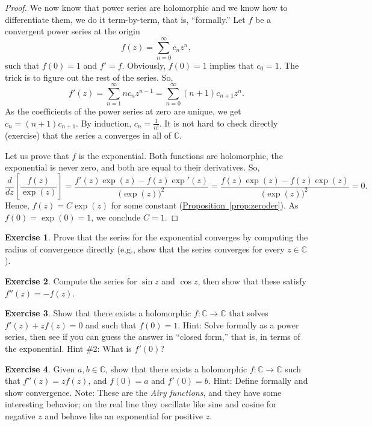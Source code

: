 \documentclass[12pt,openany]{book}
\newcommand{\C}{{\mathbb{C}}}
\newcommand{\myindex}[1]{#1\index{#1}}
\newcommand{\myquote}[1]{``#1''}
\theoremstyle{plain}
\theoremstyle{remark}
\theoremstyle{definition}
\newenvironment{exbox}{%
    \def\FrameCommand{\vrule width 1pt \relax\hspace{10pt}}%
    \MakeFramed{\advance\hsize-\width\FrameRestore}%
}{%
    \endMakeFramed
}
\theoremstyle{exercise}
\newtheorem{exercise}{Exercise}[section]
\theoremstyle{example}
\newcommand{\propref}[1]{\hyperref[#1]{Proposition~\ref*{#1}}}
\begin{document}
\begin{proof}
We now know that power series are holomorphic and we know how
to differentiate them, we do it term-by-term, that is, \myquote{formally.}
Let $f$ be a convergent power series at the origin
\begin{equation*}
f(z) = \sum_{n=0}^\infty c_n z^n ,
\end{equation*}
such that $f(0)=1$ and $f'=f$.
Obviously, $f(0)=1$ implies that $c_0 = 1$.
The trick is to figure out the rest of the series.
So,
\begin{equation*}
f'(z) =
\sum_{n=1}^\infty n c_n z^{n-1} =
\sum_{n=0}^\infty (n+1) c_{n+1} z^{n} .
\end{equation*}
As the coefficients of the power series at zero are unique, we get
$c_n = (n+1) c_{n+1}$.  By induction, $c_n = \frac{1}{n!}$.
It is not hard to check directly (exercise)
that the series a converges in all of $\C$.

Let us prove that $f$ is the exponential.  Both functions are
holomorphic, the exponential is never zero, and both are equal to their
derivatives.  So,
\begin{equation*}
\frac{d}{dz} \left[ \frac{f(z)}{\exp(z)} \right]
=
\frac{f'(z)\exp(z) - f(z) \exp'(z)}{{\bigl(\exp(z)\bigr)}^2}
=
\frac{f(z)\exp(z) - f(z) \exp(z)}{{\bigl(\exp(z)\bigr)}^2}
= 0.
\end{equation*}
Hence, $f(z) = C \exp(z)$ for some constant (\propref{prop:zeroder}).
As $f(0) = \exp(0) = 1$,
we conclude $C=1$.
\end{proof}

\begin{exbox}
\begin{exercise}
Prove that the series for the exponential converges by computing
the radius of convergence directly
(e.g., show that the series converges for every $z \in \C$).
\end{exercise}

\begin{exercise}
Compute the series for $\sin z$ and $\cos z$, then show that these satisfy
$f''(z) = -f(z)$.
\end{exercise}

\begin{exercise}
Show that there exists a holomorphic $f \colon \C \to \C$ that
solves $f'(z) + z f(z) = 0$ and such that $f(0) = 1$.  Hint: Solve formally
as a power series,
then see if you can guess the answer in \myquote{closed form,} that is, in terms
of the exponential.  Hint \#2: What is $f'(0)$?
\end{exercise}

\begin{exercise}
Given $a,b \in \C$, show that there exists a holomorphic $f \colon \C \to
\C$ such that $f''(z) = z f(z)$, and $f(0) = a$ and $f'(0) = b$.
Hint: Define formally and show convergence.
Note: These are the \emph{\myindex{Airy functions}}, and they have some
interesting behavior; on the real line they oscillate like sine and cosine
for negative $z$ and behave like an exponential for positive $z$.
\end{exercise}
\end{exbox}
\end{document}
